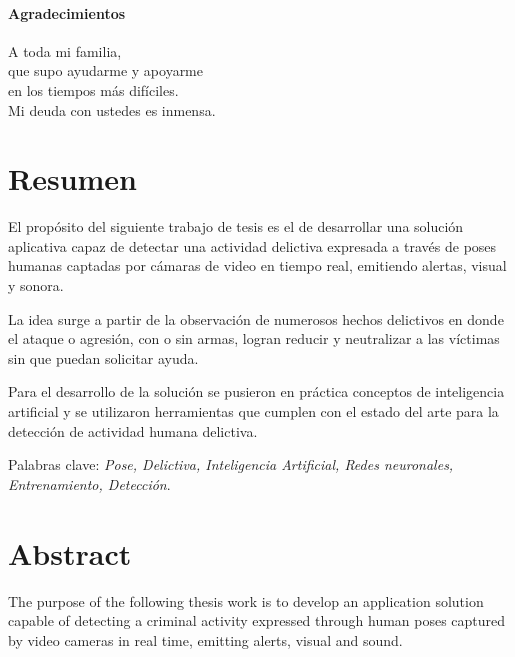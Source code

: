 \documentclass[a4paper,12pt,oneside,spanish]{book}
\begin{document}
\newpage
\begin{flushright}
	\subsubsection{Agradecimientos}
	A toda mi familia, \\
	que supo ayudarme y apoyarme \\
	en los tiempos más difíciles. \\
	Mi deuda con ustedes es inmensa.
\end{flushright}

\newpage
\tableofcontents

\newpage
\listoffigures

\newpage
\clearpage
\thispagestyle{fancy}
\setlength{\parskip}{1.3em}
\chapter{Resumen}
El propósito del siguiente trabajo de tesis es el de desarrollar una solución aplicativa capaz de detectar una actividad delictiva expresada a través de poses humanas captadas por cámaras de video en tiempo real, emitiendo alertas, visual y sonora. \par 

La idea surge a partir de la observación de numerosos hechos delictivos en donde el ataque o agresión, con o sin armas, logran reducir y neutralizar a las víctimas sin que puedan solicitar ayuda.\par 

Para el desarrollo de la solución se pusieron en práctica conceptos de inteligencia artificial y  se utilizaron herramientas que cumplen con el estado del arte para la detección de actividad humana delictiva.\par 

Palabras clave: \textit{Pose, Delictiva, Inteligencia Artificial, Redes neuronales, Entrenamiento, Detección}.

\newpage
\clearpage
\thispagestyle{fancy}
\setlength{\parskip}{1.3em}
\chapter{Abstract}
The purpose of the following thesis work is to develop an application solution capable of detecting a criminal activity expressed through human poses captured by video cameras in real time, emitting alerts, visual and sound.\par
\end{document}
